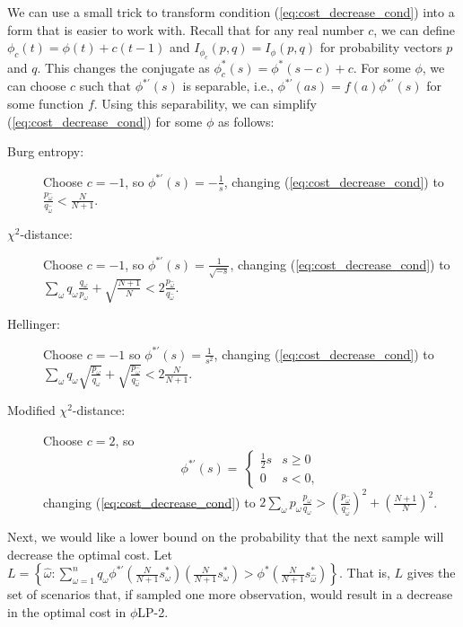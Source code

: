 \documentclass[ijoc,letterpaper]{informs3} %
\newcommand{\plp}{$\phi$LP-2}
\begin{document}
\begin{remark}
	\label{rmk:cost_decrease_trick}
	We can use a small trick to transform condition (\ref{eq:cost_decrease_cond}) into a form that is easier to work with.
	Recall that for any real number $c$, we can define $\phi_c(t) = \phi(t) + c(t-1)$ and $I_{\phi_c}(p,q) = I_\phi(p,q)$ for probability vectors $p$ and $q$.
	This changes the conjugate as $\phi_c^*(s) = \phi^*(s-c) + c$.
	For some $\phi$, we can choose $c$ such that $\phi^{*\prime}(s)$ is separable, i.e., $\phi^{*\prime}(as) = f(a) \phi^{*\prime}(s)$ for some function $f$.
	Using this separability, we can simplify (\ref{eq:cost_decrease_cond}) for some $\phi$ as follows:
	\begin{description}
		\item[Burg entropy:] Choose $c = -1$, so $\phi^{*\prime}(s) = -\frac{1}{s}$, changing (\ref{eq:cost_decrease_cond}) to $\frac{p_{\hat{\omega}}}{q_{\hat{\omega}}} < \frac{N}{N+1}$.
		\item[$\chi^2$-distance:] Choose $c = -1$, so $\phi^{*\prime}(s) = \frac{1}{\sqrt{-s}}$, changing (\ref{eq:cost_decrease_cond}) to $\sum_\omega q_\omega \frac{q_\omega}{p_\omega} + \sqrt{\frac{N+1}{N}} < 2 \frac{p_{\hat{\omega}}}{q_{\hat{\omega}}}$.
		\item[Hellinger:] Choose $c = -1$ so $\phi^{*\prime}(s) = \frac{1}{s^2}$, changing (\ref{eq:cost_decrease_cond}) to $\sum_\omega q_\omega \sqrt{\frac{p_\omega}{q_\omega}} + \sqrt{\frac{p_{\hat{\omega}}}{q_{\hat{\omega}}}} < 2 \frac{N}{N+1}$.
		\item[Modified $\chi^2$-distance:] Choose $c = 2$, so
		\[
			\phi^{*\prime}(s) = \
			\begin{cases}
				\frac{1}{2} s & s \geq 0 \\
				0 & s < 0,
			\end{cases}
		\]
		changing (\ref{eq:cost_decrease_cond}) to $2 \sum_\omega p_\omega \frac{p_\omega}{q_\omega} > \left(\frac{p_{\hat{\omega}}}{q_{\hat{\omega}}}\right)^2 + \left(\frac{N+1}{N}\right)^2$.
	\end{description}
\end{remark}

Next, we would like a lower bound on the probability that the next sample will decrease the optimal cost.
Let $L = \left\{ \hat{\omega} : \sum_{\omega=1}^n q_\omega \phi^{*\prime}\left(\frac{N}{N+1}s^*_\omega\right) \left(\frac{N}{N+1}s^*_\omega\right) > \phi^*\left(\frac{N}{N+1}s^*_{\hat{\omega}}\right) \right\}$.
That is, $L$ gives the set of scenarios that, if sampled one more observation, would result in a decrease in the optimal cost in \plp.
\end{document}
